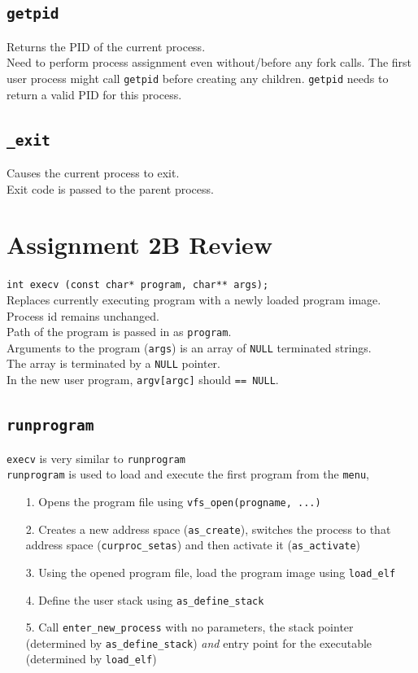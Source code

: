 \documentclass[12pt]{article}
\theoremstyle{plain}
\theoremstyle{definition}
\begin{document}
\subsection{\texttt{getpid}}
Returns the PID of the current process. \\
Need to perform process assignment even without/before any fork calls.
The first user process might call \texttt{getpid} before creating any children.
\texttt{getpid} needs to return a valid PID for this process.

\subsection{\texttt{\_exit}}
Causes the current process to exit. \\
Exit code is passed to the parent process.

\newpage
\section{Assignment 2B Review}
\texttt{int execv (const char* program, char** args);} \\

Replaces currently executing program with a newly loaded program image. \\
Process id remains unchanged. \\
Path of the program is passed in as \texttt{program}. \\
Arguments to the program (\texttt{args}) is an array of \texttt{NULL} terminated strings. \\
The array is terminated by a \texttt{NULL} pointer. \\
In the new user program, \texttt{argv[argc]} should \texttt{== NULL}.

\subsection{\texttt{runprogram}}
\texttt{execv} is very similar to \texttt{runprogram} \\
\texttt{runprogram} is used to load and execute the first program from the \texttt{menu},
\begin{enumerate}
  \item[1.] Opens the program file using \texttt{vfs\_open(progname, ...)}
  \item[2.] Creates a new address space (\texttt{as\_create}), switches the process to that address space (\texttt{curproc\_setas}) and then activate it (\texttt{as\_activate})
  \item[3.] Using the opened program file, load the program image using \texttt{load\_elf}
  \item[4.] Define the user stack using \texttt{as\_define\_stack}
  \item[5.] Call \texttt{enter\_new\_process} with no parameters, the stack pointer (determined by \texttt{as\_define\_stack}) \emph{and} entry point for the executable (determined by \texttt{load\_elf})
\end{enumerate}
\end{document}
